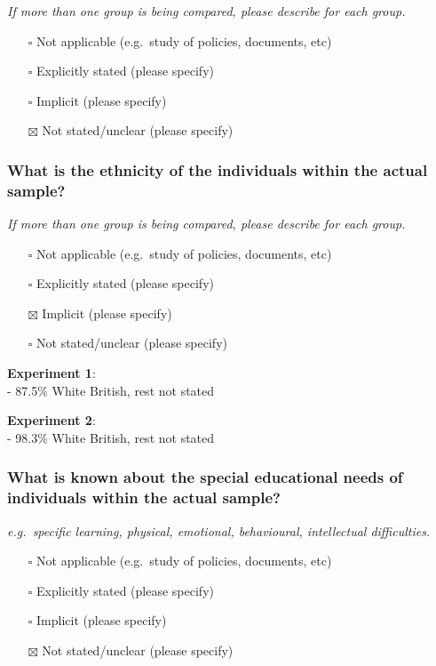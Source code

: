 \documentclass[
  doc, a4paper]{apa7}
\providecommand{\tightlist}{%
  \setlength{\itemsep}{0pt}\setlength{\parskip}{0pt}}
\begin{document}
\emph{If more than one group is being compared, please describe for each group.}

\begin{itemize}
\tightlist
\item[$\square$]
  Not applicable (e.g.~study of policies, documents, etc)
\item[$\square$]
  Explicitly stated (please specify)
\item[$\square$]
  Implicit (please specify)
\item[$\boxtimes$]
  Not stated/unclear (please specify)
\end{itemize}

\subsubsection{What is the ethnicity of the individuals within the actual sample?}\label{what-is-the-ethnicity-of-the-individuals-within-the-actual-sample}

\emph{If more than one group is being compared, please describe for each group.}

\begin{itemize}
\tightlist
\item[$\square$]
  Not applicable (e.g.~study of policies, documents, etc)
\item[$\square$]
  Explicitly stated (please specify)
\item[$\boxtimes$]
  Implicit (please specify)
\item[$\square$]
  Not stated/unclear (please specify)
\end{itemize}

\textbf{Experiment 1}:\\
- 87.5\% White British, rest not stated

\textbf{Experiment 2}:\\
- 98.3\% White British, rest not stated

\subsubsection{What is known about the special educational needs of individuals within the actual sample?}\label{what-is-known-about-the-special-educational-needs-of-individuals-within-the-actual-sample}

\emph{e.g.~specific learning, physical, emotional, behavioural, intellectual difficulties.}

\begin{itemize}
\tightlist
\item[$\square$]
  Not applicable (e.g.~study of policies, documents, etc)
\item[$\square$]
  Explicitly stated (please specify)
\item[$\square$]
  Implicit (please specify)
\item[$\boxtimes$]
  Not stated/unclear (please specify)
\end{itemize}
\end{document}
